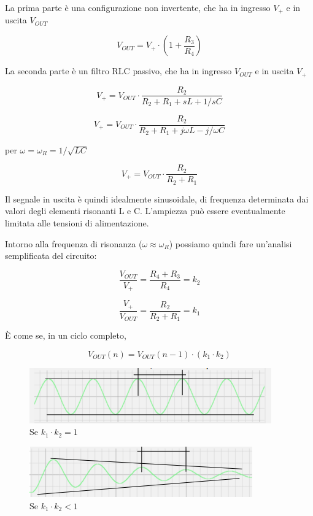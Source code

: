 \documentclass{article}
\begin{document}
La prima parte è una configurazione non invertente, che ha in ingresso $V_+$ e in uscita $V_{OUT}$

\[V_{OUT} = V_+ \cdot \left( 1 + \frac{R_3}{R_4} \right)\]

La seconda parte è un filtro RLC passivo, che ha in ingresso $V_{OUT}$ e in uscita $V_+$

\[V_+ = V_{OUT} \cdot \frac{R_2}{R_2 + R_1 + sL + 1/sC}\]

\[V_+ = V_{OUT} \cdot \frac{R_2}{R_2 + R_1 + j \omega L - j/\omega C}\]

per $\omega = \omega _R = 1/\sqrt{LC}$

\[V_+ = V_{OUT} \cdot \frac{R_2}{R_2 + R_1}\]

Il segnale in uscita è quindi idealmente sinusoidale, di frequenza determinata dai valori degli elementi risonanti L e C. L'ampiezza può essere eventualmente limitata alle tensioni di alimentazione.

\vspace{1mm}

Intorno alla frequenza di risonanza ($\omega \approx \omega _R$) possiamo quindi fare un'analisi semplificata del circuito:

\[\frac{V_{OUT}}{V_+} = \frac{R_4 + R_3}{R_4} = k_2\]

\[\frac{V_+}{V_{OUT}} = \frac{R_2}{R_2 + R_1} = k_1\]

È come se, in un ciclo completo, 

\[V_{OUT} (n) = V_{OUT} (n-1) \cdot (k_1 \cdot k_2)\]

\begin{figure}[h]
  \centering
  \includegraphics[scale=0.7]{IM_circuito_risonante_serie_attivo_grafico_0}
  \caption{Se $k_1 \cdot k_2 = 1$}
  \label{Schema_circuito_risonante_serie_attivo_grafico_0}
\end{figure}

\begin{figure}[h]
  \centering
  \includegraphics[scale=0.7]{IM_circuito_risonante_serie_attivo_grafico_1}
  \caption{Se $k_1 \cdot k_2 < 1$}
  \label{Schema_circuito_risonante_serie_attivo_grafico_1}
\end{figure}
\end{document}
